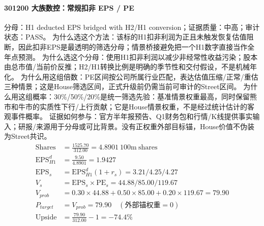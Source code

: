 \paragraph{301200 大族数控：常规扣非 EPS / PE}
分母：H1 deducted EPS bridged with H2/H1 conversion；证据质量：中高；审计状态：PASS。
为什么选这个方法：该标的H1扣非利润为正且未触发恢复估值阻断，因此扣非EPS是最透明的筛选分母；情景桥接避免把一个H1数字直接当作全年点预测。
为什么选这个分母：使用H1扣非利润以减少非经常性收益污染；股本由总市值/当前价反推；H2/H1转换比例是明确的季节性和交付假设，不是机械年化。
为什么用这组倍数：PE区间按公司所属行业匹配，表达估值压缩/正常/重估三种情景；这是House筛选区间，正式升级前仍需当前可审计的Street区间。
为什么用这组概率：30\%/50\%/20\%是统一筛选先验：基准情景权重最高，同时保留熊市和牛市的实质性下行/上行贡献；它是House情景权重，不是经过统计估计的客观事件概率。
证据如何参与：官方半年报预告、Q1财务包和行情/K线提供事实输入；研报/来源用于分母或可比背景。没有正权重外部目标锚，House价值不伪装为Street共识。
\begin{align*}
\mathrm{Shares} &= \frac{1525.70}{312.00}=4.8901\ \mathrm{100m\ shares}\\
\mathrm{EPS}_{H1}^d &= \frac{9.50}{4.8901}=1.9427\\
\mathrm{EPS}_s &= \mathrm{EPS}_{H1}^d(1+r_s)=3.21/4.25/4.27\\
V_s &= \mathrm{EPS}_s\times \mathrm{PE}_s=44.88/85.00/119.67\\
V_{prob} &= 0.30\times 44.88+0.50\times 85.00+0.20\times 119.67=79.90\\
P_{target} &= V_{prob}=79.90\quad(\text{外部锚权重}=0)\\
\mathrm{Upside} &= \frac{79.90}{312.00}-1=-74.4\%\\
\end{align*}

